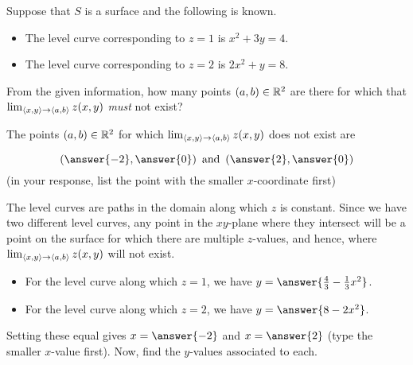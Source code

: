 \documentclass{ximera}
\author{Jim Talamo}
\begin{document}
\begin{exercise}
Suppose that $S$ is a surface and the following is known.

\begin{itemize}
\item The level curve corresponding to $z=1$ is $x^2+3y=4$.
\item The level curve corresponding to $z=2$ is $2x^2+y=8$.
\end{itemize}

From the given information, how many points $(a,b) \in \mathbb R^2$ are there for which that $\lim_{\left\langle x,y\right\rangle \to \left\langle a,b\right\rangle} z(x,y)$ \emph{must} not exist?

\begin{multipleChoice}
\end{multipleChoice}

\begin{exercise}
The points $(a,b) \in \mathbb R^2$ for which $\lim_{\left\langle x,y\right\rangle \to \left\langle a,b\right\rangle} z(x,y)$ does not exist are 

\[
\left(\answer{-2},\answer{0}\right) \textrm{ and } \left(\answer{2},\answer{0}\right)
\]
(in your response, list the point with the smaller $x$-coordinate first)



\begin{hint}
The level curves are paths in the domain along which $z$ is constant.  Since we have two different level curves, any point in the $xy$-plane where they intersect will be a point on the surface for which there are multiple $z$-values, and hence, where $\lim_{\left\langle x,y\right\rangle \to \left\langle a,b\right\rangle} z(x,y)$ will not exist.

\begin{itemize}
\item For the level curve along which $z=1$, we have $y = \answer{\frac{4}{3}-\frac{1}{3}x^2}$.
\item For the level curve along which $z=2$, we have $y = \answer{8-2x^2}$.
\end{itemize}

Setting these equal gives $x=\answer{-2}$ and $x=\answer{2}$ (type the smaller $x$-value first).  Now, find the $y$-values associated to each.
\end{hint}

\end{exercise}

\end{exercise}
\end{document}
